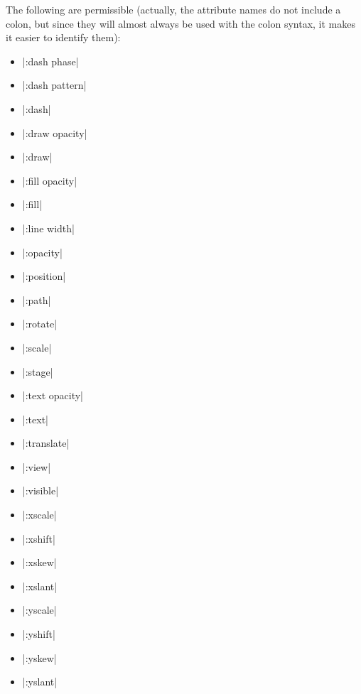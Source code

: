 \label{section-anim-attrs}


The following  are permissible (actually, the
attribute names do not include a colon, but since they will almost
always be used with the colon syntax, it makes it easier to identify them):

\begin{itemize}\itemsep0pt
\item |:dash phase|
\item |:dash pattern|
\item |:dash|
\item |:draw opacity|
\item |:draw|
\item |:fill opacity|
\item |:fill|
\item |:line width|
\item |:opacity|
\item |:position|
\item |:path|
\item |:rotate|
\item |:scale|
\item |:stage|
\item |:text opacity|
\item |:text|
\item |:translate|
\item |:view|
\item |:visible|
\item |:xscale|
\item |:xshift|
\item |:xskew|
\item |:xslant|
\item |:yscale|
\item |:yshift|
\item |:yskew|
\item |:yslant|
\end{itemize}

